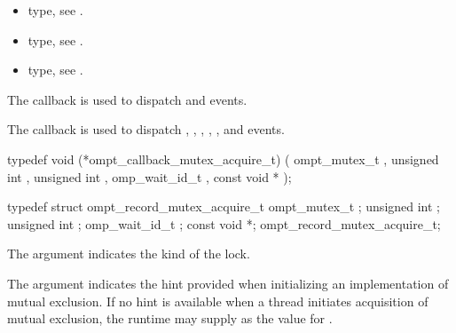 \crossreferences
\begin{itemize}
\item {} type, see
.
\item {} type, see
.
\item {} type, see
.
\end{itemize}


\label{sec:ompt_callback_mutex_acquire_t}
\summary
The  callback is used to dispatch
 and  events.

The  callback is used to dispatch
, , ,
, ,
 and  events.

\format

\begin{ccppspecific}
\begin{omptCallback}
typedef void (*ompt_callback_mutex_acquire_t) (
  ompt_mutex_t ,
  unsigned int ,
  unsigned int ,
  omp_wait_id_t ,
  const void *
);
\end{omptCallback}
\end{ccppspecific}


\record

\begin{ccppspecific}
\begin{omptRecord}
typedef struct ompt_record_mutex_acquire_t {
  ompt_mutex_t ;
  unsigned int ;
  unsigned int ;
  omp_wait_id_t ;
  const void *;
} ompt_record_mutex_acquire_t;
\end{omptRecord}
\end{ccppspecific}


\argdesc

The argument  indicates the kind of the lock.

The argument  indicates the hint provided when initializing
an implementation of mutual exclusion.
If no hint is available when a thread initiates acquisition of mutual exclusion,
the runtime may supply  as the value for .


